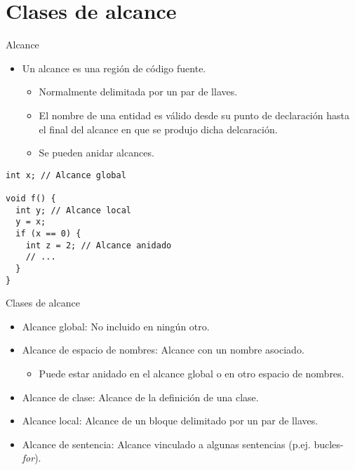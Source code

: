 \section{Clases de alcance}

\begin{frame}[fragile]{Alcance}
\begin{itemize}
  \item Un \alert{alcance} es una región de código fuente.
    \begin{itemize}
      \item Normalmente delimitada por un par de llaves.
      \item El nombre de una entidad es válido desde su punto de declaración hasta el
            final del alcance en que se produjo dicha delcaración.
      \item Se pueden anidar alcances.
    \end{itemize}
\end{itemize}
\begin{lstlisting}
int x; // Alcance global

void f() {
  int y; // Alcance local
  y = x;
  if (x == 0) {
    int z = 2; // Alcance anidado
    // ...
  }
}
\end{lstlisting}
\end{frame}

\begin{frame}{Clases de alcance}
\begin{itemize}
  \item \alert{Alcance global}: No incluido en ningún otro.
  \item \alert{Alcance de espacio de nombres}: Alcance con un nombre asociado.
    \begin{itemize}
      \item Puede estar anidado en el alcance global o en otro espacio de nombres.
    \end{itemize}
  \item \alert{Alcance de clase}: Alcance de la definición de una clase.
  \item \alert{Alcance local}: Alcance de un bloque delimitado por un par de llaves.
  \item \alert{Alcance de sentencia}: Alcance vinculado a algunas sentencias (p.ej. bucles-\emph{for}).
\end{itemize}
\end{frame}

